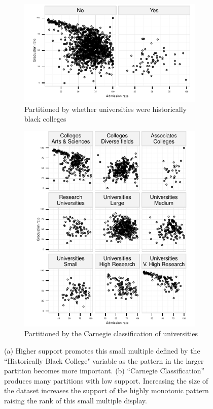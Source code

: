 \begin{figure}[t]
 \centering 
 	 \begin{subfigure}{3.5in}
		\includegraphics[width=3.5in]{images/Historically_Black_College.pdf}
		  \caption{Partitioned by whether universities were historically black colleges}
		 \label{fig:support1}
 	\end{subfigure}
 	 \begin{subfigure}{3.5in}
		\includegraphics[width=3.5in]{images/Carnegie_Classification.pdf}
		  \caption{Partitioned by the Carnegie classification of universities}
		 \label{fig:support2}
 	\end{subfigure}
	\caption{(a) Higher support promotes this small multiple defined by the ``Historically Black College" variable as the pattern in the larger partition becomes more important. (b) ``Carnegie Classification'' produces many partitions with low support. Increasing the size of the dataset increases the support of the highly monotonic pattern raising the rank of this small multiple display.}
\end{figure}


